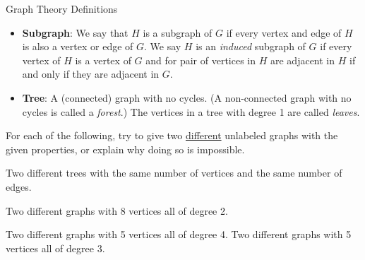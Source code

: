 \documentclass[12pt]{article}
\begin{document}
\begin{defbox}{Graph Theory Definitions}
\begin{itemize}
    \item[] \textbf{Subgraph}: We say that $H$ is a subgraph of $G$ if every vertex and edge of $H$ is also a vertex or edge of $G$.  We say $H$ is an {\em induced} subgraph of $G$ if every vertex of $H$ is a vertex of $G$ and for pair of vertices in $H$ are adjacent in $H$ if and only if they are adjacent in $G$.
    \item[] \textbf{Tree}: A (connected) graph with no cycles.  (A non-connected graph with no cycles is called a {\em forest}.)  The vertices in a tree with degree 1 are called {\em leaves}.
  \end{itemize}

\end{defbox}

\begin{activity}
For each of the following, try to give two \underline{different} unlabeled graphs with the given properties, or explain why doing so is impossible.
\begin{questions}
\question Two different trees with the same number of vertices and the same number of edges.

\question Two different graphs with 8 vertices all of degree 2.

\question Two different graphs with 5 vertices all of degree 4.
\question Two different graphs with 5 vertices all of degree 3.




\end{questions}
\end{activity}
\end{document}
